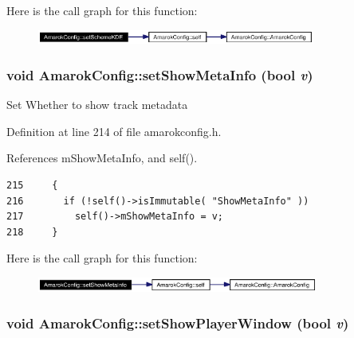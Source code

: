 Here is the call graph for this function:\begin{figure}[H]
\begin{center}
\leavevmode
\includegraphics[width=259pt]{classAmarokConfig_AmarokConfige101_cgraph}
\end{center}
\end{figure}
\subsubsection{\setlength{\rightskip}{0pt plus 5cm}void Amarok\-Config::set\-Show\-Meta\-Info (bool {\em v})\hspace{0.3cm}{\tt  [inline, static]}}\label{classAmarokConfig_AmarokConfige21}


Set Whether to show track metadata 

Definition at line 214 of file amarokconfig.h.

References m\-Show\-Meta\-Info, and self().



\footnotesize\begin{verbatim}215     {
216       if (!self()->isImmutable( "ShowMetaInfo" ))
217         self()->mShowMetaInfo = v;
218     }
\end{verbatim}\normalsize 


Here is the call graph for this function:\begin{figure}[H]
\begin{center}
\leavevmode
\includegraphics[width=262pt]{classAmarokConfig_AmarokConfige21_cgraph}
\end{center}
\end{figure}
\subsubsection{\setlength{\rightskip}{0pt plus 5cm}void Amarok\-Config::set\-Show\-Player\-Window (bool {\em v})\hspace{0.3cm}{\tt  [inline, static]}}\label{classAmarokConfig_AmarokConfige25}


